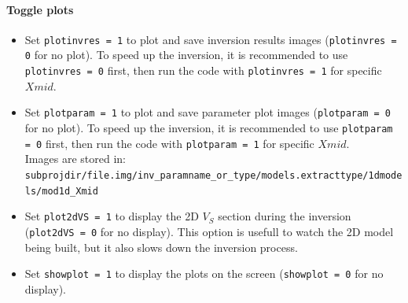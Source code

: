 \documentclass[twoside,a4paper]{article}
\begin{document}
\paragraph{Toggle plots}
\begin{itemize}[leftmargin=*]
\setlength\itemsep{2ex}
\item Set \verb|plotinvres = 1| to plot and save inversion results images (\verb|plotinvres = 0| for no plot). To speed up the inversion, it is recommended to use \verb|plotinvres = 0| first, then run the code with \verb|plotinvres = 1| for specific $Xmid$.

\item Set \verb|plotparam = 1| to plot and save parameter plot images (\verb|plotparam = 0| for no plot). To speed up the inversion, it is recommended to use \verb|plotparam = 0| first, then run the code with \verb|plotparam = 1| for specific $Xmid$.\\[1ex]
Images are stored in:\\
\verb|subprojdir/file.img/inv_paramname_or_type/models.extracttype/1dmodels/mod1d_Xmid| 

\item Set \verb|plot2dVS = 1| to display the 2D $V_S$ section during the inversion (\verb|plot2dVS = 0| for no display). This option is usefull to watch the 2D model being built, but it also slows down the inversion process.

\item Set \verb|showplot = 1| to display the plots on the screen (\verb|showplot = 0| for no display).
\end{itemize}
\end{document}
